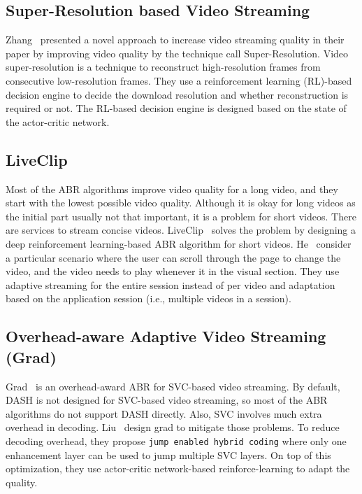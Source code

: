 \subsection{Super-Resolution based Video Streaming}
Zhang \etal\ presented a novel approach to increase video streaming quality in their paper \cite{9155384} by improving video quality by the technique call Super-Resolution. Video super-resolution is a technique to reconstruct high-resolution frames from consecutive low-resolution frames. They use a reinforcement learning (RL)-based decision engine to decide the download resolution and whether reconstruction is required or not. The RL-based decision engine is designed based on the state of the actor-critic network.

\subsection{LiveClip}
Most of the ABR algorithms improve video quality for a long video, and they start with the lowest possible video quality. Although it is okay for long videos as the initial part usually not that important, it is a problem for short videos. There are services to stream concise videos. LiveClip~\cite{10.1145/3386290.3396937} solves the problem by designing a deep reinforcement learning-based ABR algorithm for short videos. He \etal\ consider a particular scenario where the user can scroll through the page to change the video, and the video needs to play whenever it in the visual section. They use adaptive streaming for the entire session instead of per video and adaptation based on the application session (i.e., multiple videos in a session).

\subsection{Overhead-aware Adaptive Video Streaming (Grad)}
Grad~\cite{10.1145/3394171.3413512} is an overhead-award ABR for SVC-based video streaming. By default, DASH is not designed for SVC-based video streaming, so most of the ABR algorithms do not support DASH directly. Also, SVC involves much extra overhead in decoding. Liu \etal\ design grad to mitigate those problems. To reduce decoding overhead, they propose {\tt jump enabled hybrid coding} where only one enhancement layer can be used to jump multiple SVC layers. On top of this optimization, they use actor-critic network-based reinforce-learning to adapt the quality.

